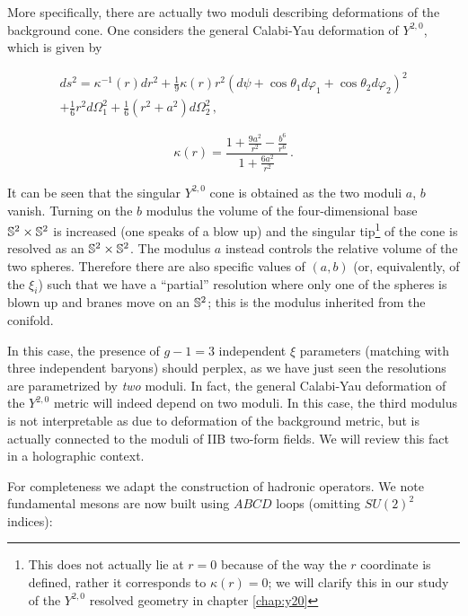 More specifically, there are actually two moduli describing deformations of the background cone\cite{Benvenutifourcycles}. One considers the general Calabi-Yau deformation of $Y^{2,0}$, which is given by\cite{PandoZayasy20}

\begin{equation}
	\begin{split}
	ds^2 = \kappa^{-1}(r) dr^2 + \frac{1}{9} \kappa(r) r^2 \left( d\psi + \cos\theta_1 d\varphi_1 + \cos\theta_2 d\varphi_2 \right)^2 \\
	+ \frac{1}{6} r^2 d\Omega_1^2 + \frac{1}{6}(r^2 + a^2) d\Omega_2^2\,,
	\label{genCYy20cones}
\end{split}
\end{equation}

\begin{equation}
	\kappa(r) = \frac{1 + \frac{9a^2}{r^2} - \frac{b^6}{r^6}}{1 + \frac{6a^2}{r^2}}\,.
	\label{}
\end{equation}

It can be seen that the singular $Y^{2,0}$ cone is obtained as the two moduli $a$, $b$ vanish. Turning on the $b$ modulus the volume of the four-dimensional base $\mathbb{S}^2\times \mathbb{S}^2$ is increased (one speaks of a blow up) and the singular tip\footnote{This does not actually lie at $r=0$ because of the way the $r$ coordinate is defined, rather it corresponds to $\kappa(r) = 0$; we will clarify this in our study of the $Y^{2,0}$ resolved geometry in chapter \ref{chap:y20}} of the cone is resolved as an $\mathbb{S}^2 \times \mathbb{S}^2$. The modulus $a$ instead controls the relative volume of the two spheres. Therefore there are also specific values of $(a,b)$ (or, equivalently, of the $\xi_i$) such that we have a ``partial'' resolution where only one of the spheres is blown up and branes move on an $\mathbb{S}^2$; this is the modulus inherited from the conifold.

In this case, the presence of $g-1 = 3$ independent $\xi$ parameters (matching with three independent baryons) should perplex, as we have just seen the resolutions are parametrized by \emph{two} moduli. In fact, the general Calabi-Yau deformation of the $Y^{2,0}$ metric will indeed depend on two moduli. In this case, the third modulus is not interpretable as due to deformation of the background metric, but is actually connected to the moduli of IIB two-form fields. We will review this fact in a holographic context.

For completeness we adapt the construction of hadronic operators. We note fundamental mesons are now built using $ABCD$ loops (omitting $SU(2)^2$ indices):

